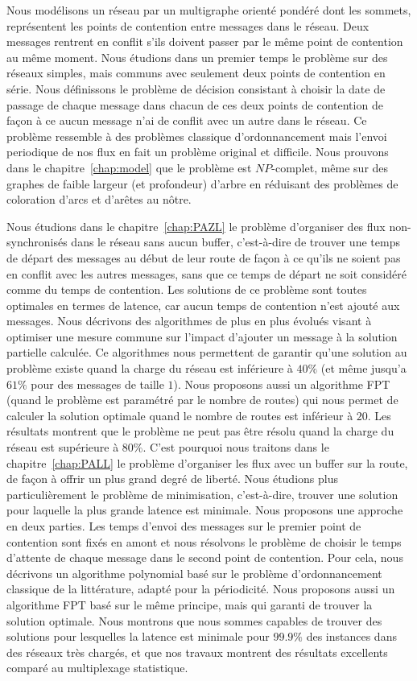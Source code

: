 Nous modélisons un réseau par un multigraphe orienté pondéré dont les sommets, représentent les points de contention entre messages dans le réseau. Deux messages rentrent en conflit s’ils doivent passer par le même point de contention au même moment. Nous étudions dans un premier temps le problème sur des réseaux simples, mais communs avec seulement deux points de contention en série. Nous définissons le problème de décision consistant à choisir la date de passage de chaque message dans chacun de ces deux points de contention de façon à ce aucun message n'ai de conflit avec un autre dans le réseau. Ce problème ressemble à des problèmes classique d'ordonnancement mais l'envoi periodique de nos flux en fait un problème original et difficile.
 Nous prouvons dans le chapitre~\ref{chap:model} que le problème est $NP$-complet, même sur des graphes de faible largeur (et profondeur) d'arbre en réduisant des problèmes de coloration d'arcs et d'arêtes au nôtre.


Nous étudions dans le chapitre~\ref{chap:PAZL} le problème d'organiser des flux non-synchronisés dans le réseau sans aucun buffer, c’est-à-dire de trouver une temps de départ des messages au début de leur route de façon à ce qu'ils ne soient pas en conflit avec les autres messages, sans que ce temps de départ ne soit considéré comme du temps de contention. Les solutions de ce problème sont toutes optimales en termes de latence, car aucun temps de contention n'est ajouté aux messages. Nous décrivons des algorithmes de plus en plus évolués visant à optimiser une mesure commune sur l'impact d'ajouter un message à la solution partielle calculée. Ce algorithmes nous permettent de garantir qu'une solution au problème existe quand la charge du réseau est inférieure à $40\%$ (et même jusqu'a $61\%$ pour des messages de taille $1$). Nous proposons aussi un algorithme FPT (quand le problème est paramétré par le nombre de routes) qui nous permet de calculer la solution optimale quand le nombre de routes est inférieur à $20$. Les résultats montrent que le problème ne peut pas être résolu quand la charge du réseau est supérieure à $80\%$.
C'est pourquoi nous traitons dans le chapitre~\ref{chap:PALL} le problème d'organiser les flux avec un buffer sur la route, de façon à offrir un plus grand degré de liberté. Nous étudions plus particulièrement le problème de minimisation, c'est-à-dire, trouver une solution pour laquelle la plus grande latence est minimale. Nous proposons une approche en deux parties. Les temps d'envoi des messages sur le premier point de contention sont fixés en amont et nous résolvons le problème de choisir le temps d'attente de chaque message dans le second point de contention. Pour cela, nous décrivons un algorithme polynomial basé sur le problème d'ordonnancement classique de la littérature, adapté pour la périodicité. Nous proposons aussi un algorithme FPT basé sur le même principe, mais qui garanti de trouver la solution optimale. Nous montrons que nous sommes capables de trouver des solutions pour lesquelles la latence est minimale pour $99.9\%$ des instances dans des réseaux très chargés, et que nos travaux montrent des résultats excellents comparé au multiplexage statistique.

